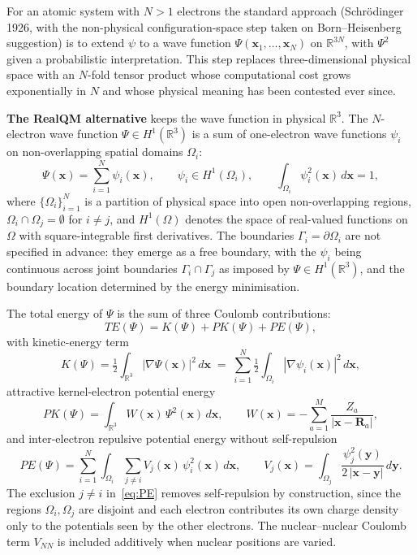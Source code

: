 \documentclass[11pt]{article}
\begin{document}
For an atomic system with $N>1$ electrons the standard approach (Schr\"odinger 1926, with the non-physical configuration-space step taken on Born--Heisenberg suggestion) is to extend $\psi$ to a wave function $\Psi(\mathbf{x}_1, \ldots, \mathbf{x}_N)$ on $\mathbb{R}^{3N}$, with $\Psi^2$ given a probabilistic interpretation. This step replaces three-dimensional physical space with an $N$-fold tensor product whose computational cost grows exponentially in $N$ and whose physical meaning has been contested ever since.

\textbf{The RealQM alternative} keeps the wave function in physical $\mathbb{R}^3$. The $N$-electron wave function $\Psi \in H^1(\mathbb{R}^3)$ is a sum of one-electron wave functions $\psi_i$ on non-overlapping spatial domains $\Omega_i$:
\begin{equation}\label{eq:Psi-sum}
\Psi(\mathbf{x}) = \sum_{i=1}^{N} \psi_i(\mathbf{x}),
\qquad
\psi_i \in H^1(\Omega_i), \qquad \int_{\Omega_i} \psi_i^2(\mathbf{x})\, d\mathbf{x} = 1,
\end{equation}
where $\{\Omega_i\}_{i=1}^{N}$ is a partition of physical space into open non-overlapping regions, $\Omega_i \cap \Omega_j = \emptyset$ for $i \ne j$, and $H^1(\Omega)$ denotes the space of real-valued functions on $\Omega$ with square-integrable first derivatives. The boundaries $\Gamma_i = \partial \Omega_i$ are not specified in advance: they emerge as a free boundary, with the $\psi_i$ being continuous across joint boundaries $\Gamma_i \cap \Gamma_j$ as imposed by $\Psi \in H^1(\mathbb{R}^3)$, and the boundary location determined by the energy minimisation.

The total energy of $\Psi$ is the sum of three Coulomb contributions:
\begin{equation}\label{eq:TE}
TE(\Psi) = K(\Psi) + PK(\Psi) + PE(\Psi),
\end{equation}
with kinetic-energy term
\begin{equation}\label{eq:K}
K(\Psi) = \tfrac{1}{2} \int_{\mathbb{R}^3} |\nabla \Psi(\mathbf{x})|^2\, d\mathbf{x}
\;=\; \sum_{i=1}^{N} \tfrac{1}{2} \int_{\Omega_i} |\nabla \psi_i(\mathbf{x})|^2\, d\mathbf{x},
\end{equation}
attractive kernel-electron potential energy
\begin{equation}\label{eq:PK}
PK(\Psi) = \int_{\mathbb{R}^3} W(\mathbf{x})\, \Psi^2(\mathbf{x})\, d\mathbf{x},
\qquad
W(\mathbf{x}) = -\sum_{a=1}^{M} \frac{Z_a}{|\mathbf{x} - \mathbf{R}_a|},
\end{equation}
and inter-electron repulsive potential energy without self-repulsion
\begin{equation}\label{eq:PE}
PE(\Psi) = \sum_{i=1}^{N} \int_{\Omega_i} \sum_{j \ne i} V_j(\mathbf{x})\, \psi_i^2(\mathbf{x})\, d\mathbf{x},
\qquad
V_j(\mathbf{x}) = \int_{\Omega_j} \frac{\psi_j^2(\mathbf{y})}{2\,|\mathbf{x} - \mathbf{y}|}\, d\mathbf{y}.
\end{equation}
The exclusion $j \ne i$ in~\eqref{eq:PE} removes self-repulsion by construction, since the regions $\Omega_i, \Omega_j$ are disjoint and each electron contributes its own charge density only to the potentials seen by the other electrons. The nuclear--nuclear Coulomb term $V_{NN}$ is included additively when nuclear positions are varied.
\end{document}
